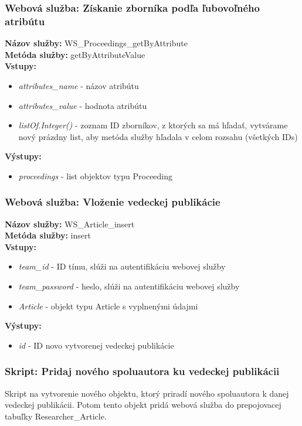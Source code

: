 \documentclass[10pt,oneside,slovak,a4paper]{article}
\begin{document}
\subsubsection{Webová služba: Získanie zborníka podľa ľubovoľného atribútu}
\textbf{Názov služby:} WS\_Proceedings\_getByAttribute\\
\textbf{Metóda služby:} getByAttributeValue\\
\textbf{Vstupy:}
	\begin{itemize}
		\item \textit{attributes\_name} - názov atribútu
		\item \textit{attributes\_value} - hodnota atribútu
		\item \textit{listOf.Integer()} - zoznam ID zborníkov, z ktorých sa má hľadať, vytvárame nový prázdny list, aby metóda služby hľadala v celom rozsahu (všetkých IDs)
	\end{itemize}
\textbf{Výstupy:}
	\begin{itemize}
		\item \textit{proceedings} - list objektov typu Proceeding
	\end{itemize}
	
\subsubsection{Webová služba: Vloženie vedeckej publikácie}
\textbf{Názov služby:} WS\_Article\_insert\\
\textbf{Metóda služby:} insert\\
\textbf{Vstupy:}\\
	\begin{itemize}
		\item \textit{team\_id} - ID tímu, slúži na autentifikáciu webovej služby
		\item \textit{team\_password} - heslo, slúži na autentifikáciu webovej služby
		\item \textit{Article} - objekt typu Article s vyplnenými údajmi
	\end{itemize}
\textbf{Výstupy:}
	\begin{itemize}
		\item \textit{id} - ID novo vytvorenej vedeckej publikácie
	\end{itemize}
	
	\subsubsection{Skript: Pridaj nového spoluautora ku vedeckej publikácii}
Skript na vytvorenie nového objektu, ktorý priradí nového spoluautora k danej vedeckej publikácii. Potom tento objekt pridá webová služba do prepojovacej tabuľky Researcher\_Article.
\end{document}

